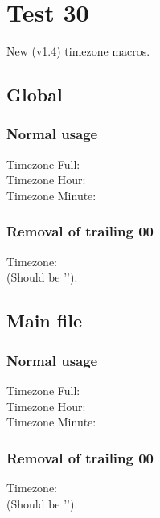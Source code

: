 \documentclass[12pt]{report}
\begin{document}
\chapter{Test 30}
New (v1.4) timezone macros.

\section{Global}

\subsection{Normal usage}
Timezone Full:   \svntimezone\\
Timezone Hour:   \svntimezonehour\\
Timezone Minute: \svntimezoneminute\\

\subsection{Removal of trailing 00}
Timezone: \\
(Should be '\svntimezone').

\section{Main file}

\subsection{Normal usage}
Timezone Full:   \svnfiletimezone\\
Timezone Hour:   \svnfiletimezonehour\\
Timezone Minute: \svnfiletimezoneminute\\

\subsection{Removal of trailing 00}
Timezone: \\
(Should be '\svnfiletimezone').


\end{document}
